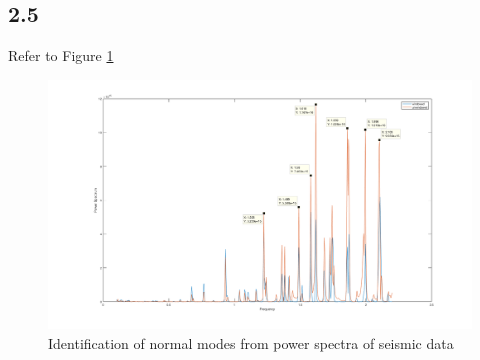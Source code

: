 \subsection*{2.5}
Refer to Figure \ref{fig:part2_5}
\newpage
\begin{landscape}
\begin{figure}[]
	\caption{Identification of normal modes from power spectra of seismic data}
	\label{fig:part2_5}
	\includegraphics[width=\linewidth]{figures/part2_5.png}
\end{figure}
\end{landscape}
\newpage
